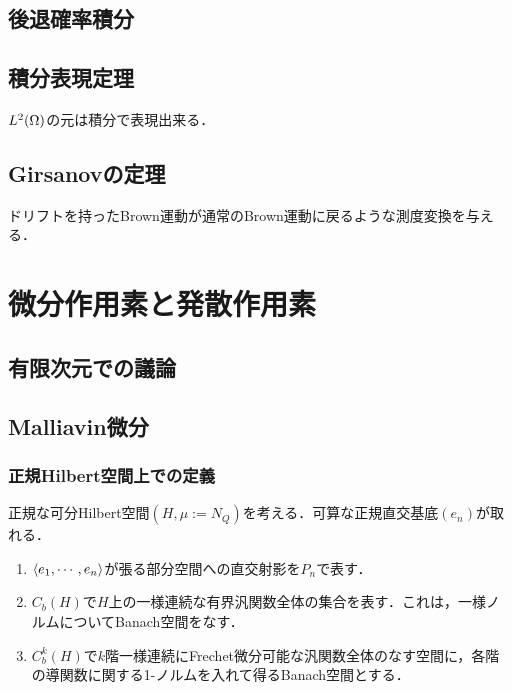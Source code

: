 \documentclass[uplatex,dvipdfmx]{jsreport}
\begin{document}
\section{後退確率積分}

\section{積分表現定理}

\begin{tcolorbox}[colframe=ForestGreen, colback=ForestGreen!10!white,breakable,colbacktitle=ForestGreen!40!white,coltitle=black,fonttitle=\bfseries\sffamily,
title=]
    $L^2(\Omega)$の元は積分で表現出来る．
\end{tcolorbox}

\section{Girsanovの定理}

\begin{tcolorbox}[colframe=ForestGreen, colback=ForestGreen!10!white,breakable,colbacktitle=ForestGreen!40!white,coltitle=black,fonttitle=\bfseries\sffamily,
title=]
    ドリフトを持ったBrown運動が通常のBrown運動に戻るような測度変換を与える．
\end{tcolorbox}

\chapter{微分作用素と発散作用素}

\section{有限次元での議論}

\section{Malliavin微分}

\subsection{正規Hilbert空間上での定義}

\begin{notation}
    正規な可分Hilbert空間$(H,\mu:=N_Q)$を考える．可算な正規直交基底$(e_n)$が取れる．
    \begin{enumerate}
        \item $\langle e_1,\cdots,e_n\rangle$が張る部分空間への直交射影を$P_n$で表す．
        \item $C_b(H)$で$H$上の一様連続な有界汎関数全体の集合を表す．これは，一様ノルムについてBanach空間をなす．
        \item $C_b^k(H)$で$k$階一様連続にFrechet微分可能な汎関数全体のなす空間に，各階の導関数に関する1-ノルムを入れて得るBanach空間とする．
    \end{enumerate}
\end{notation}
\end{document}
